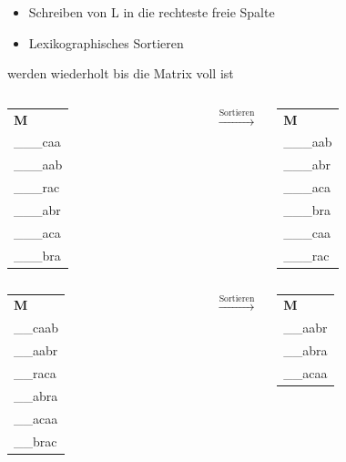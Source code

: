 \documentclass[14pt,xcolor=dvipsnames,pdftex]{beamer}
\begin{document}
\begin{frame}[allowframebreaks]
\begin{itemize}
 \begin{itemize}
  \item Schreiben von L in die rechteste freie Spalte
  \item Lexikographisches Sortieren
 \end{itemize}
 werden wiederholt bis die Matrix voll ist
\end{itemize}
\framebreak
\begin{columns}
 \begin{tabular}{T}
    \textbf{M} \\
    \_\_\_{\color{red}c}aa\\
    \_\_\_{\color{red}a}ab\\
    \_\_\_{\color{red}r}ac\\
    \_\_\_{\color{red}a}br\\
    \_\_\_{\color{red}a}ca\\
    \_\_\_{\color{red}b}ra
  \end{tabular}
 $\xrightarrow{\text{Sortieren}}$
 \begin{tabular}{T}
    \textbf{M} \\
    \_\_\_aab\\
    \_\_\_abr\\
    \_\_\_aca\\
    \_\_\_bra\\
    \_\_\_caa\\
    \_\_\_rac
  \end{tabular}
\end{columns}
\framebreak
\begin{columns}
 \begin{tabular}{T}
    \textbf{M} \\
    \_\_{\color{red}c}aab\\
    \_\_{\color{red}a}abr\\
    \_\_{\color{red}r}aca\\
    \_\_{\color{red}a}bra\\
    \_\_{\color{red}a}caa\\
    \_\_{\color{red}b}rac
  \end{tabular}
 $\xrightarrow{\text{Sortieren}}$
 \begin{tabular}{T}
    \textbf{M} \\
    \_\_aabr\\
    \_\_abra\\
    \_\_acaa\\

\end{tabular}
\end{columns}
\end{frame}
\end{document}

